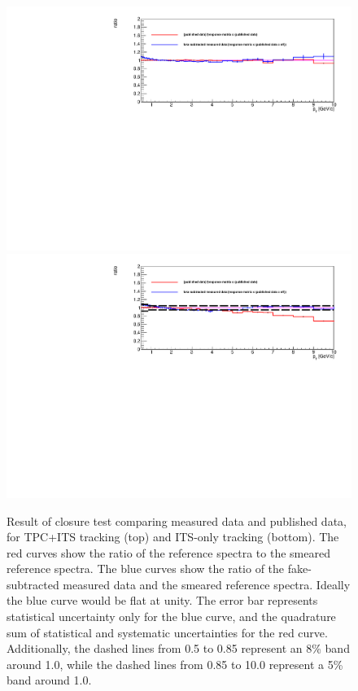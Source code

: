 \begin{figure}[htpb]
\center
\includegraphics[width=.95\textwidth]{Data_Analysis/Tracking/ratio_refolding_pPb_tpc_MBMC_1GeV15GeV_errors.pdf}
\includegraphics[width=.95\textwidth]{Data_Analysis/Tracking/ratio_refolding_pPb_its_MBMC_0GeV15GeV_errors_band.pdf}
\caption{Result of closure test comparing measured data and published data, for TPC+ITS tracking (top) and ITS-only tracking (bottom). The red curves show the ratio of the reference spectra to the smeared reference spectra. The blue curves show the ratio of the fake-subtracted measured data and the smeared reference spectra. Ideally the blue curve would be flat at unity. The error bar represents statistical uncertainty only for the blue curve, and the quadrature sum of statistical and systematic uncertainties for the red curve. Additionally, the dashed lines from 0.5 to 0.85 \GeVc represent an 8\% band around 1.0, while the dashed lines from 0.85 to 10.0 \GeVc represent a 5\% band around 1.0.}
\label{fig:RefoldedComparison}
\end{figure}

